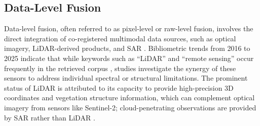 \documentclass[]{interact}
\theoremstyle{plain}%
\theoremstyle{definition}
\theoremstyle{remark}
\DeclareRobustCommand{\DIFadd}[1]{{\protect\color{DIFaddcolor}\uwave{#1}}}
\DeclareRobustCommand{\DIFdel}[1]{{\protect\color{DIFdelcolor}\sout{#1}}}
\def\DIFadd#1{#1}%
\def\DIFdel#1{}%
\begin{document}
\FloatBarrier

\subsection{\DIFadd{Data-Level} Fusion}
\DIFdel{Data}
\DIFadd{Data-level} fusion, often referred to as pixel-level or raw-level fusion, involves the direct integration of \DIFadd{co-registered} multimodal data sources, such as optical imagery, \DIFdel{LiDAR} \DIFdel{point} \DIFdel{clouds} \DIFadd{LiDAR-derived} \DIFadd{products}, and \DIFdel{Synthetic} \DIFdel{Aperture} \DIFdel{Radar} \DIFdel{(} SAR\DIFdel{)} \citep{57}. Bibliometric trends from 2016 to 2025 indicate that while keywords such as ``LiDAR'' and ``remote sensing'' \DIFdel{maintain} \DIFdel{significant} \DIFdel{research} \DIFdel{heat} \DIFadd{occur} \DIFadd{frequently} \DIFadd{in} \DIFadd{the} \DIFadd{retrieved} \DIFadd{corpus} \citep{38, 39}, \DIFdel{emerging} \DIFdel{focus} \DIFdel{has} \DIFdel{shifted} \DIFdel{toward} \DIFadd{studies} \DIFadd{investigate} the synergy of these sensors to \DIFdel{overcome} \DIFadd{address} individual spectral or structural limitations. The prominent status of LiDAR is attributed to its capacity to provide high-precision 3D coordinates and vegetation structure information, which \DIFdel{effectively} \DIFdel{compensates} \DIFdel{for} \DIFdel{the} \DIFdel{spectral} \DIFdel{saturation} \DIFdel{and} \DIFdel{cloud-cover} \DIFdel{vulnerabilities} \DIFdel{of} \DIFadd{can} \DIFadd{complement} optical \DIFadd{imagery} \DIFadd{from} sensors like Sentinel-2\DIFadd{;} \DIFadd{cloud-penetrating} \DIFadd{observations} \DIFadd{are} \DIFadd{provided} \DIFadd{by} \DIFadd{SAR} \DIFadd{rather} \DIFadd{than} \DIFadd{LiDAR} \citep{40}.
\end{document}
